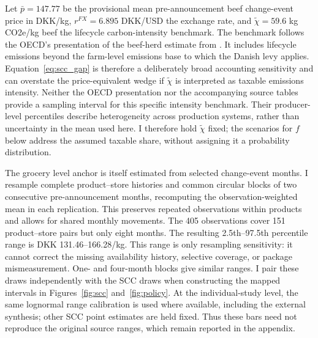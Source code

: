 \documentclass[11pt]{article}
\begin{document}
Let $\bar p=147.77$ be the provisional mean pre-announcement beef change-event price in DKK/kg, $r^{FX}=6.895$ DKK/USD the exchange rate, and $\widetilde{\chi}=59.6$ kg CO2e/kg beef the lifecycle carbon-intensity benchmark. The benchmark follows the OECD's presentation of the beef-herd estimate from \citet{poore2018} \citep{oecd2025}. It includes lifecycle emissions beyond the farm-level emissions base to which the Danish levy applies. Equation~\eqref{eq:scc_gap} is therefore a deliberately broad accounting sensitivity and can overstate the price-equivalent wedge if $\widetilde{\chi}$ is interpreted as taxable emissions intensity. Neither the OECD presentation nor the accompanying source tables provide a sampling interval for this specific intensity benchmark. Their producer-level percentiles describe heterogeneity across production systems, rather than uncertainty in the mean used here. I therefore hold $\widetilde\chi$ fixed; the scenarios for $f$ below address the assumed taxable share, without assigning it a probability distribution.

The grocery level anchor is itself estimated from selected change-event months. I resample complete product--store histories and common circular blocks of two consecutive pre-announcement months, recomputing the observation-weighted mean in each replication. This preserves repeated observations within products and allows for shared monthly movements. The 405 observations cover 151 product--store pairs but only eight months. The resulting 2.5th--97.5th percentile range is DKK 131.46--166.28/kg. This range is only resampling sensitivity: it cannot correct the missing availability history, selective coverage, or package mismeasurement. One- and four-month blocks give similar ranges. I pair these draws independently with the SCC draws when constructing the mapped intervals in Figures~\ref{fig:scc} and~\ref{fig:policy}. At the individual-study level, the same lognormal range calibration is used where available, including the external synthesis; other SCC point estimates are held fixed. Thus these bars need not reproduce the original source ranges, which remain reported in the appendix.
\end{document}
